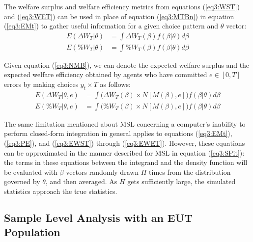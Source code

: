 \documentclass[../main.tex]{subfiles}
\begin{document}
The welfare surplus and welfare efficiency metrics from equations (\ref{eq3:WST}) and (\ref{eq3:WET}) can be used in place of equation (\ref{eq3:MTBn}) in equation (\ref{eq3:EMt}) to gather useful information for a given choice pattern and $\theta$ vector:
\begin{align}
	E( \Delta W_T | \theta) &= \int \Delta W_T(\beta) f(\beta | \theta) d \beta \label{eq3:EWST}\\
	E( \% W_T | \theta) &= \int \% W_T(\beta) f(\beta | \theta) d \beta \label{eq3:EWET}
\end{align}

Given equation (\ref{eq3:NMB}), we can denote the expected welfare surplus and the expected welfare efficiency obtained by agents who have committed $e \in [0,T]$ errors by making choices $y_t \times T$ as follows:
\begin{align}
	E( \Delta W_T | \theta, e) &= \int \bigr( \Delta W_T(\beta) \times N[M(\beta),e] \bigr) f(\beta | \theta) d \beta \label{eq3:EDWTe}\\
	E( \% W_T | \theta, e) &= \int \bigl( \% W_T(\beta) \times N[M(\beta),e] \bigr) f(\beta | \theta) d \beta \label{eq3:EPWTe}
\end{align}

The same limitation mentioned about MSL concerning a computer's inability to perform closed-form integration in general applies to equations (\ref{eq3:EMt}), (\ref{eq3:PE}), and (\ref{eq3:EWST}) through (\ref{eq3:EWET}).
However, these equations can be approximated in the manner described for MSL in equation (\ref{eq3:SPit}): the terms in these equations between the integrand and the density function will be evaluated with $\beta$ vectors randomly drawn $H$ times from the distribution governed by $\theta$, and then averaged.
As $H$ gets sufficiently large, the simulated statistics approach the true statistics.

\singlespacing
\subsection{Sample Level Analysis with an EUT Population}
\doublespacing
\end{document}
